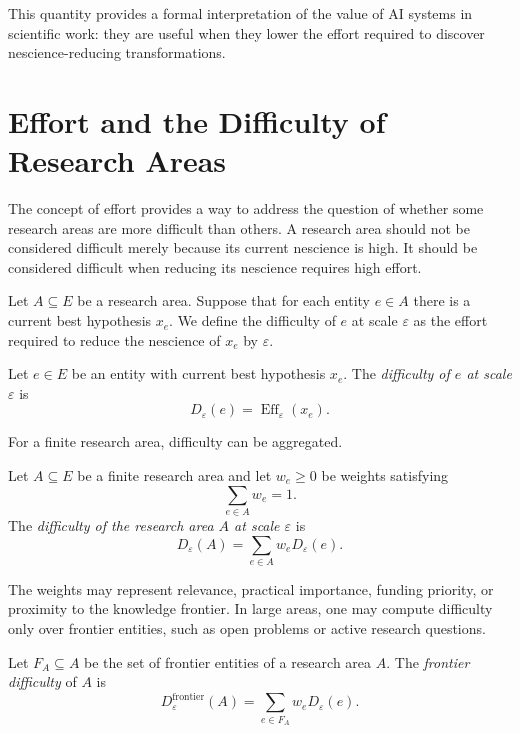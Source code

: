 This quantity provides a formal interpretation of the value of AI systems in scientific work: they are useful when they lower the effort required to discover nescience-reducing transformations.

\section{Effort and the Difficulty of Research Areas}
\label{sec:effort_difficulty_research_areas}

The concept of effort provides a way to address the question of whether some research areas are more difficult than others. A research area should not be considered difficult merely because its current nescience is high. It should be considered difficult when reducing its nescience requires high effort.

Let \(A\subseteq E\) be a research area. Suppose that for each entity \(e\in A\) there is a current best hypothesis \(x_e\). We define the difficulty of \(e\) at scale \(\varepsilon\) as the effort required to reduce the nescience of \(x_e\) by \(\varepsilon\).

\begin{definition}
Let \(e\in E\) be an entity with current best hypothesis \(x_e\). The \emph{difficulty of \(e\) at scale \(\varepsilon\)} is
\[
D_{\varepsilon}(e)=\operatorname{Eff}_{\varepsilon}(x_e).
\]
\end{definition}

For a finite research area, difficulty can be aggregated.

\begin{definition}
Let \(A\subseteq E\) be a finite research area and let \(w_e\geq 0\) be weights satisfying
\[
\sum_{e\in A}w_e=1.
\]
The \emph{difficulty of the research area \(A\) at scale \(\varepsilon\)} is
\[
D_{\varepsilon}(A)=\sum_{e\in A}w_eD_{\varepsilon}(e).
\]
\end{definition}

The weights may represent relevance, practical importance, funding priority, or proximity to the knowledge frontier. In large areas, one may compute difficulty only over frontier entities, such as open problems or active research questions.

\begin{definition}
Let \(F_A\subseteq A\) be the set of frontier entities of a research area \(A\). The \emph{frontier difficulty} of \(A\) is
\[
D_{\varepsilon}^{\mathrm{frontier}}(A)
=
\sum_{e\in F_A}w_eD_{\varepsilon}(e).
\]
\end{definition}

